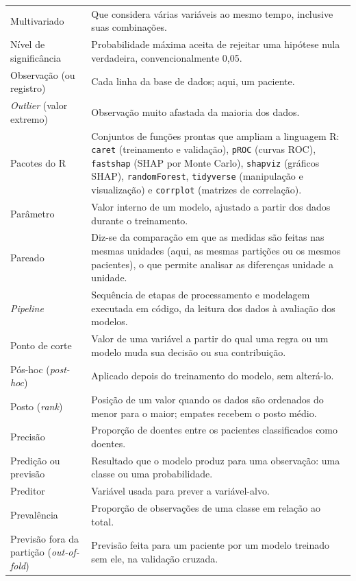 \begin{longtable}{@{}p{3.8cm}p{10.7cm}@{}}
Multivariado & Que considera várias variáveis ao mesmo tempo, inclusive suas combinações. \\[0.15cm]
Nível de significância & Probabilidade máxima aceita de rejeitar uma hipótese nula verdadeira, convencionalmente 0,05. \\[0.15cm]
Observação (ou registro) & Cada linha da base de dados; aqui, um paciente. \\[0.15cm]
\textit{Outlier} (valor extremo) & Observação muito afastada da maioria dos dados. \\[0.15cm]
Pacotes do R & Conjuntos de funções prontas que ampliam a linguagem R: \texttt{caret} (treinamento e validação), \texttt{pROC} (curvas ROC), \texttt{fastshap} (SHAP por Monte Carlo), \texttt{shapviz} (gráficos SHAP), \texttt{randomForest}, \texttt{tidyverse} (manipulação e visualização) e \texttt{corrplot} (matrizes de correlação). \\[0.15cm]
Parâmetro & Valor interno de um modelo, ajustado a partir dos dados durante o treinamento. \\[0.15cm]
Pareado & Diz-se da comparação em que as medidas são feitas nas mesmas unidades (aqui, as mesmas partições ou os mesmos pacientes), o que permite analisar as diferenças unidade a unidade. \\[0.15cm]
\textit{Pipeline} & Sequência de etapas de processamento e modelagem executada em código, da leitura dos dados à avaliação dos modelos. \\[0.15cm]
Ponto de corte & Valor de uma variável a partir do qual uma regra ou um modelo muda sua decisão ou sua contribuição. \\[0.15cm]
Pós-hoc (\textit{post-hoc}) & Aplicado depois do treinamento do modelo, sem alterá-lo. \\[0.15cm]
Posto (\textit{rank}) & Posição de um valor quando os dados são ordenados do menor para o maior; empates recebem o posto médio. \\[0.15cm]
Precisão & Proporção de doentes entre os pacientes classificados como doentes. \\[0.15cm]
Predição ou previsão & Resultado que o modelo produz para uma observação: uma classe ou uma probabilidade. \\[0.15cm]
Preditor & Variável usada para prever a variável-alvo. \\[0.15cm]
Prevalência & Proporção de observações de uma classe em relação ao total. \\[0.15cm]
Previsão fora da partição (\textit{out-of-fold}) & Previsão feita para um paciente por um modelo treinado sem ele, na validação cruzada. \\[0.15cm]

\end{longtable}
